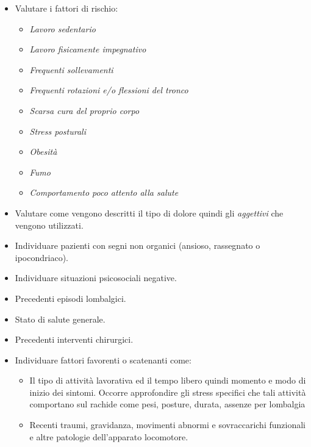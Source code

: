 \begin{itemize}
\item
   
  Valutare i fattori di rischio:


\begin{itemize}
\item
  \emph{Lavoro sedentario}
\item
  \emph{Lavoro fisicamente impegnativo}
\item
  \emph{Frequenti sollevamenti}
\item
  \emph{Frequenti rotazioni e/o flessioni del tronco}
\item
  \emph{Scarsa cura del proprio corpo}
\item
  \emph{Stress posturali}
\item
  \emph{Obesità}
\item
  \emph{Fumo}
\item
  \emph{Comportamento poco attento alla salute}
\end{itemize}

\item
   
  Valutare come vengono descritti il tipo di dolore quindi gli
  \emph{aggettivi} che vengono utilizzati.
   

\item
   
  Individuare pazienti con segni non organici (ansioso, rassegnato o
  ipocondriaco).
   

\item
   
  Individuare situazioni psicosociali negative.

\item
   
  Precedenti episodi lombalgici.

\item
   
  Stato di salute generale.
   

\item
   
  Precedenti interventi chirurgici.
   

\item
   
  Individuare fattori favorenti o scatenanti come:
   

\begin{itemize}
\item
  Il tipo di attività lavorativa ed il tempo libero quindi momento e
  modo di inizio dei sintomi. Occorre approfondire gli stress specifici
  che tali attività comportano sul rachide come pesi, posture, durata,
  assenze per lombalgia
\item
  Recenti traumi, gravidanza, movimenti abnormi e sovraccarichi
  funzionali e altre patologie dell'apparato locomotore.
\end{itemize}
\end{itemize}

